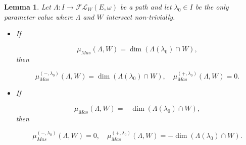 \documentclass[a4paper,10pt]{article}
\newtheorem{lemma}[theorem]{Lemma}
\begin{document}
\begin{lemma}\label{MaslovMidpoint}
Let $\Lambda:I\rightarrow\mathcal{FL}_W(E,\omega)$ be a path and let $\lambda_0\in I$ be the only parameter value where $\Lambda$ and $W$ intersect non-trivially.

\begin{itemize}
\item If

\[\mu_{Mas}(\Lambda,W)=\dim(\Lambda(\lambda_0)\cap W),\]
then

\[ \mu^{(-,\lambda_0)}_{Mas}(\Lambda,W)=\dim(\Lambda(\lambda_0)\cap W),\quad \mu^{(+,\lambda_0)}_{Mas}(\Lambda,W)=0.\]
\item If

\[\mu_{Mas}(\Lambda,W)=-\dim(\Lambda(\lambda_0)\cap W),\]
then

\[\mu^{(-,\lambda_0)}_{Mas}(\Lambda,W)=0,\quad \mu^{(+,\lambda_0)}_{Mas}(\Lambda,W)=-\dim(\Lambda(\lambda_0)\cap W).\]
\end{itemize} 
\end{lemma}
\end{document}
